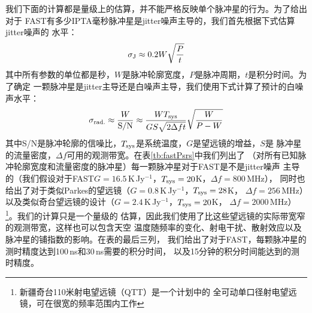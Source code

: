 我们下面的计算都是量级上的估算，并不能严格反映单个脉冲星的行为。为了给出对于
FAST有多少IPTA毫秒脉冲星是jitter噪声主导的，我们首先根据下式估算jitter噪声的
水平\supercite{Shannon12}：
\begin{equation}\label{eqn:jitter}
\sigma_{\rm J} \approx 0.2 W \sqrt{\frac{P}{t}}
\end{equation}
其中所有参数的单位都是秒，$W$是脉冲轮廓宽度，$P$是脉冲周期，$t$是积分时间。为了确定
一颗脉冲星是jitter主导还是白噪声主导，我们使用下式计算了预计的白噪声水平：
\begin{equation}
\sigma_{\rm rad.} \approx \frac{W}{\rm S/N} \approx \frac{W T_{\rm sys}}{GS\sqrt{2\Delta ft}}\sqrt{\frac{W}{P-W}}
\end{equation}
其中S/N是脉冲轮廓的信噪比，$T_{\rm sys}$是系统温度，$G$是望远镜的增益，$S$是
脉冲星的流量密度，$\Delta f$可用的观测带宽。在表\ref{tb:fastPsrs}中我们列出了
（对所有已知脉冲轮廓宽度和流量密度的脉冲星）每一颗脉冲星对于FAST是不是jitter噪声
主导的（我们假设对于FAST$G=16.5$\,K\,Jy$^{-1}$，$T_{\rm sys} = 20$K，$\Delta f = 800$\,MHz），
同时也给出了对于类似Parkes的望远镜（$G=0.8$\,K\,Jy$^{-1}$，$T_{\rm sys} = 28$K，
$\Delta f = 256$\,MHz）以及类似奇台望远镜的设计（$G=2.4$\,K\,Jy$^{-1}$，$T_{\rm sys} = 20$K，
$\Delta f = 2000$\,MHz）\footnote{新疆奇台110米射电望远镜（QTT）是一个计划中的
全可动单口径射电望远镜，可在很宽的频率范围内工作}。我们的计算只是一个量级的
估算，因此我们使用了比这些望远镜的实际带宽窄的观测带宽，这样也可以包含天空
温度随频率的变化、射电干扰、散射效应以及脉冲星的铺指数的影响。在表的最后三列，
我们给出了对于FAST，每颗脉冲星的测时精度达到100\,ns和30\,ns需要的积分时间，
以及15分钟的积分时间能达到的测时精度。

